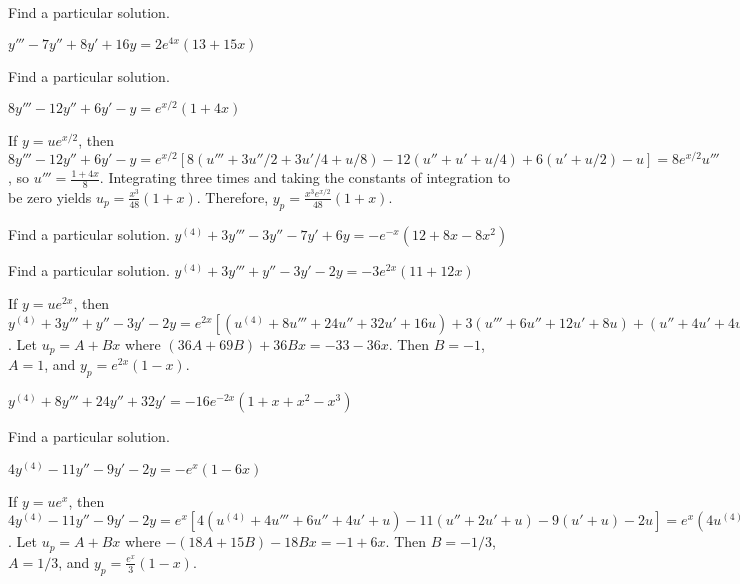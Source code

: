 \documentclass{ximera}
\begin{document}
\begin{problem}\label{exer:9.3.11}   Find a particular solution.

$y'''-7y''+8y'+16y=2e^{4x}(13+15x)$
\end{problem}

\begin{problem}\label{exer:9.3.12}   Find a particular solution.

$8y'''-12y''+6y'-y=e^{x/2}(1+4x)$

\begin{solution}
If $y=ue^{x/2}$, then
$8y'''-12y''+6y'-y=e^{x/2}[ 8(u'''+3u''/2+3u'/4+u/8) -12(u''+u'+u/4)
+6(u'+u/2) -u] =8e^{x/2}u'''$, so $u'''=\frac{1+4x}{8}$. Integrating
three times and taking the constants of integration to be zero yields
$u_p=\frac{x^3}{48}(1+x)$. Therefore,
$y_p=\frac{x^3e^{x/2}}{48}(1+x)$.
\end{solution}
\end{problem}

\begin{problem}\label{exer:9.3.13}   Find a particular solution.   $y^{(4)}+3y'''-3y''-7y'+6y=-e^{-x}(12+8x-8x^2)$
\end{problem}

\begin{problem}\label{exer:9.3.14}   Find a particular solution.   $y^{(4)}+3y'''+y''-3y'-2y=-3e^{2x}(11+12x)$

\begin{solution}
If $y=ue^{2x}$, then
$y^{(4)}+3y'''+y''-3y'-2y=e^{2x}[ (u^{(4)}+8u'''+24u''+32u'+16u)
+3(u'''+6u''+12u'+8u) +(u''+4u'+4u) -3(u'+2u) -2u]
=e^{2x}(u^{(4)}+11u'''+43u''+69u'+36u)$. Let $u_p=A+Bx$ where
$(36A+69B)+36Bx=-33-36x$. Then $B=-1$, $A=1$, and $y_p=e^{2x}(1-x)$.
\end{solution}
\end{problem}

\begin{problem}\label{exer:9.3.15}
$y^{(4)}+8y'''+24y''+32y'=-16e^{-2x}(1+x+x^2-x^3)$
\end{problem}

\begin{problem}\label{exer:9.3.16}   Find a particular solution.

$4y^{(4)}-11y''-9y'-2y=-e^x(1-6x)$

\begin{solution}
If $y=ue^x$, then $4y^{(4)}-11y''-9y'-2y=e^x[
4(u^{(4)}+4u'''+6u''+4u'+u) -11(u''+2u'+u) -9(u'+u) -2u]
=e^x(4u^{(4)}+16u'''+13u''-15u'-18u)$. Let $u_p=A+Bx$ where
$-(18A+15B)-18Bx=-1+6x$. Then $B=-1/3$, $A=1/3$, and
$y_p=\frac{e^x}{3}(1-x)$.
\end{solution}
\end{problem}
\end{document}
